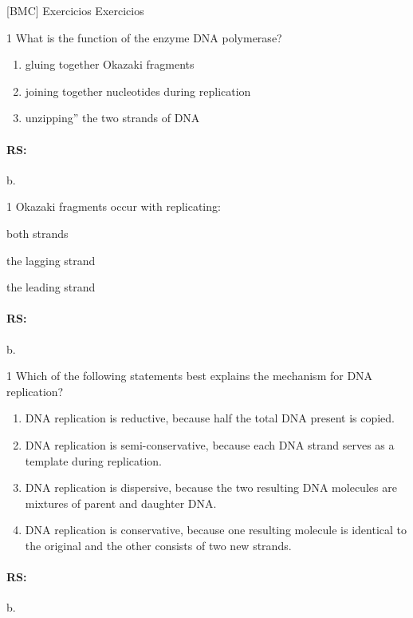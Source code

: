 \documentclass[\mainfilename]{subfiles}
\begin{document}
\renewcommand\theenumi{\alph{enumi}}

[BMC]
{Exercicios}
{Exercicios}

\begin{questionBox}1{ %
    What is the function of the enzyme DNA polymerase?
} %
    \begin{enumerate}
        \item gluing together Okazaki fragments
        \item joining together nucleotides during replication 
        \item unzipping'' the two strands of DNA
    \end{enumerate}

    \paragraph*{RS:} b.
\end{questionBox}

\begin{questionBox}1{ %
    Okazaki fragments occur with replicating:
} %
    \begin{enumerate}
        \begin{multicols}{3}
            \item both strands
            \item the lagging strand 
            \item the leading strand
        \end{multicols}
    \end{enumerate}

    \paragraph*{RS:} b.
\end{questionBox}

\begin{questionBox}1{ %
    Which of the following statements best explains the mechanism for DNA replication?
} %
    \begin{enumerate}
        \item  DNA replication is reductive, because half the total DNA present is copied.
        \item DNA replication is semi-conservative, because each DNA strand serves as a template during replication.
        \item DNA replication is dispersive, because the two resulting DNA molecules are mixtures of parent and daughter DNA.
        \item DNA replication is conservative, because one resulting molecule is identical to the original and the other consists of two new strands.
    \end{enumerate}
    \paragraph*{RS:} b.
\end{questionBox}
\end{document}
